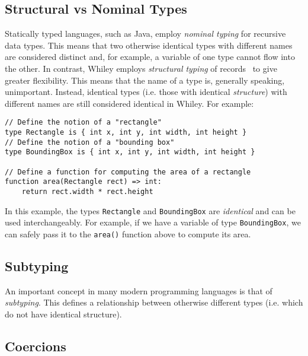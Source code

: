 \subsection{Structural vs Nominal Types}
Statically typed languages, such as Java, employ {\em nominal typing}
for recursive data types.  This means that two otherwise identical
types with different names are considered distinct and, for example, a
variable of one type cannot flow into the other.  In contrast, Whiley employs {\em structural typing} of records~\cite{Card88} to give greater flexibility.  This means that the name of a type is, generally speaking, unimportant.  Instead, identical types (i.e. those with identical {\em structure}) with different names are still considered identical in Whiley.  For example:

\begin{lstlisting}
// Define the notion of a "rectangle"
type Rectangle is { int x, int y, int width, int height }
// Define the notion of a "bounding box"
type BoundingBox is { int x, int y, int width, int height }

// Define a function for computing the area of a rectangle
function area(Rectangle rect) => int:
    return rect.width * rect.height
\end{lstlisting}

In this example, the types \lstinline{Rectangle} and \lstinline{BoundingBox} are {\em identical} and can be used interchangeably.  For example, if we have a variable of type \lstinline{BoundingBox}, we can safely pass it to the \lstinline{area()} function above to compute its area.



\subsection{Subtyping}

An important concept in many modern programming languages is that of {\em subtyping}.  This defines a relationship between otherwise different types (i.e. which do not have identical structure).  

\subsection{Coercions}

